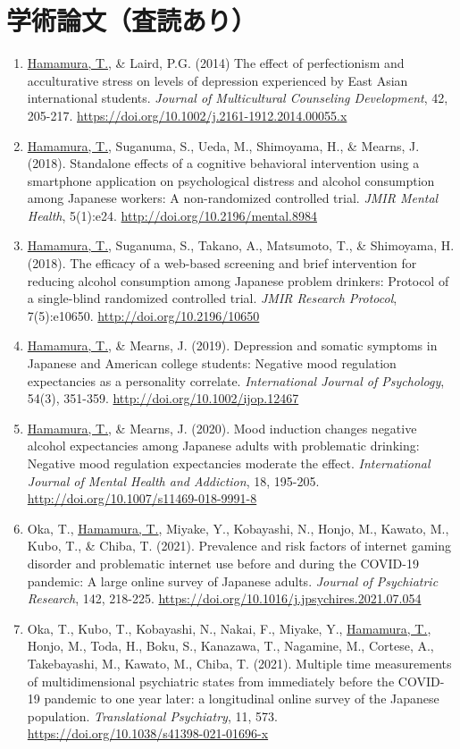 \documentclass[11pt,a4paper]{article}
\begin{document}
\section{学術論文（査読あり）}
\begin{enumerate}
	\item \underline{Hamamura, T.}, \& Laird, P.G. (2014) The effect of perfectionism and acculturative stress on levels of depression experienced by East Asian international students. \textit{Journal of Multicultural Counseling Development}, 42, 205-217. \url{https://doi.org/10.1002/j.2161-1912.2014.00055.x}
	\item \underline{Hamamura, T.}, Suganuma, S., Ueda, M., Shimoyama, H., \& Mearns, J. (2018). Standalone effects of a cognitive behavioral intervention using a smartphone application on psychological distress and alcohol consumption among Japanese workers: A non-randomized controlled trial. \textit{JMIR Mental Health}, 5(1):e24. \url{http://doi.org/10.2196/mental.8984}
	\item \underline{Hamamura, T.}, Suganuma, S., Takano, A., Matsumoto, T., \& Shimoyama, H. (2018). The efficacy of a web-based screening and brief intervention for reducing alcohol consumption among Japanese problem drinkers: Protocol of a single-blind randomized controlled trial. \textit{JMIR Research Protocol}, 7(5):e10650.  \url{http://doi.org/10.2196/10650}
	\item \underline{Hamamura, T.}, \& Mearns, J. (2019). Depression and somatic symptoms in Japanese and American college students: Negative mood regulation expectancies as a personality correlate. \textit{International Journal of Psychology}, 54(3), 351-359. \url{http://doi.org/10.1002/ijop.12467}
	\item \underline{Hamamura, T.}, \& Mearns, J. (2020). Mood induction changes negative alcohol expectancies among Japanese adults with problematic drinking: Negative mood regulation expectancies moderate the effect. \textit{International Journal of Mental Health and Addiction}, 18, 195-205. \url{http://doi.org/10.1007/s11469-018-9991-8}
	\item Oka, T., \underline{Hamamura, T.}, Miyake, Y.,  Kobayashi, N., Honjo, M., Kawato, M., Kubo, T., \& Chiba, T. (2021). Prevalence and risk factors of internet gaming disorder and problematic internet use before and during the COVID-19 pandemic: A large online survey of Japanese adults. \textit{Journal of Psychiatric Research}, 142, 218-225. \url{https://doi.org/10.1016/j.jpsychires.2021.07.054}
	\item Oka, T., Kubo, T., Kobayashi, N., Nakai, F., Miyake, Y., \underline{Hamamura, T.}, Honjo, M., Toda, H., Boku, S., Kanazawa, T., Nagamine, M.,  Cortese, A., Takebayashi, M., Kawato, M., Chiba, T. (2021). Multiple time measurements of multidimensional psychiatric states from immediately before the COVID-19 pandemic to one year later: a longitudinal online survey of the Japanese population. \textit{Translational Psychiatry}, 11, 573. \url{https://doi.org/10.1038/s41398-021-01696-x}

\end{enumerate}
\end{document}
